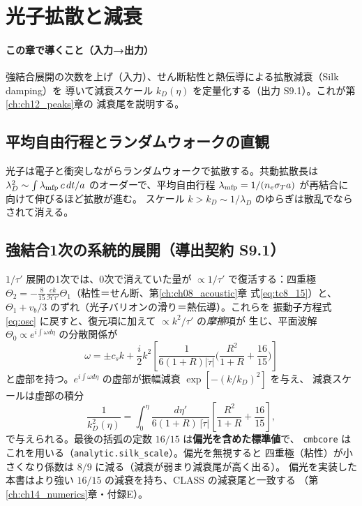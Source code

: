 \section{光子拡散と減衰}
\label{ch:ch09_damping}

\paragraph{この章で導くこと（入力→出力）}
強結合展開の次数を上げ（入力）、せん断粘性と熱伝導による拡散減衰（Silk damping）を
導いて減衰スケール $k_D(\eta)$ を定量化する（出力 S9.1）。これが第\ref{ch:ch12_peaks}章の
減衰尾を説明する。

\subsection{平均自由行程とランダムウォークの直観}
光子は電子と衝突しながらランダムウォークで拡散する。共動拡散長は
$\lambda_D^2\sim\int\lambda_{\rm mfp}\,c\,dt/a$ のオーダーで、平均自由行程
$\lambda_{\rm mfp}=1/(n_e\sigma_T a)$ が再結合に向けて伸びるほど拡散が進む。
スケール $k>k_D\sim1/\lambda_D$ のゆらぎは散乱でならされて消える。

\subsection{強結合1次の系統的展開（導出契約 S9.1）}
$1/\tau'$ 展開の1次では、0次で消えていた量が $\propto1/\tau'$ で復活する：四重極
$\Theta_2=-\frac{8}{15}\frac{ck}{\mathcal H\tau'}\Theta_1$（粘性＝せん断、第\ref{ch:ch08_acoustic}章
式\eqref{eq:tc8_15}）と、$\Theta_1+v_b/3$ のずれ（光子バリオンの滑り＝熱伝導）。これらを
振動子方程式\eqref{eq:osc} に戻すと、復元項に加えて $\propto k^2/\tau'$ の\emph{摩擦}項が
生じ、平面波解 $\Theta_0\propto e^{i\int\omega d\eta}$ の分散関係が
\begin{equation}
  \omega=\pm c_sk+\frac{i}{2}k^2\!\left[\frac{1}{6(1+R)|\dot\tau|}
  \Big(\frac{R^2}{1+R}+\frac{16}{15}\Big)\right]
\end{equation}
と虚部を持つ。$e^{i\int\omega d\eta}$ の虚部が振幅減衰 $\exp[-(k/k_D)^2]$ を与え、
減衰スケールは虚部の積分
\begin{equation}
  \frac{1}{k_D^2(\eta)}=\int_0^\eta\frac{d\eta'}{6(1+R)\,|\dot\tau|}
  \left[\frac{R^2}{1+R}+\frac{16}{15}\right],
  \label{eq:kD}
\end{equation}
で与えられる。最後の括弧の定数 $16/15$ は\textbf{偏光を含めた標準値}で、
\texttt{cmbcore} はこれを用いる（\texttt{analytic.silk\_scale}）。偏光を無視すると
四重極（粘性）が小さくなり係数は $8/9$ に減る（減衰が弱まり減衰尾が高く出る）。
偏光を実装した本書はより強い $16/15$ の減衰を持ち、CLASS の減衰尾と一致する
（第\ref{ch:ch14_numerics}章・付録E）。

